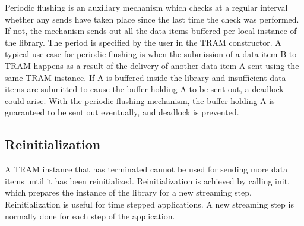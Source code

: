 Periodic flushing is an auxiliary mechanism which checks at a regular
interval whether any sends have taken place since the last time the
check was performed. If not, the mechanism sends out all the data
items buffered per local instance of the library. The period is
specified by the user in the TRAM constructor. A typical use case
for periodic flushing is when the submission of a data item B to
TRAM happens as a result of the delivery of another data item A
sent using the same TRAM instance. If A is buffered inside the library
and insufficient data items are submitted to cause the buffer holding
A to be sent out, a deadlock could arise. With the periodic flushing
mechanism, the buffer holding A is guaranteed to be sent out
eventually, and deadlock is prevented.


\subsection{Reinitialization}

A TRAM instance that has terminated cannot be used for
sending more data items until it has been
reinitialized. Reinitialization is achieved by calling init, which
prepares the instance of the library for a new streaming
step. Reinitialization is useful for time stepped applications. A new
streaming step is normally done for each step of the application.


